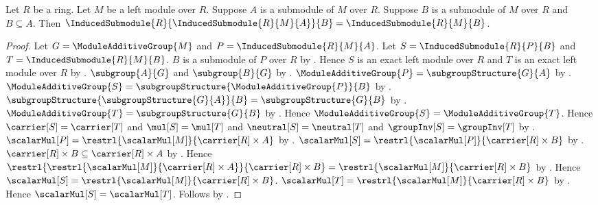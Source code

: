 \begin{theorem}\label{iterated_induced_submodule}
    Let $R$ be a ring.
    Let $M$ be a left module over $R$.
    Suppose $A$ is a submodule of $M$ over $R$.
    Suppose $B$ is a submodule of $M$ over $R$ and $B\subseteq A$.
    Then
        $\InducedSubmodule{R}{\InducedSubmodule{R}{M}{A}}{B}
            =\InducedSubmodule{R}{M}{B}$.
\end{theorem}
\begin{proof}
    Let $G=\ModuleAdditiveGroup{M}$ and
        $P=\InducedSubmodule{R}{M}{A}$.
    Let $S=\InducedSubmodule{R}{P}{B}$ and
        $T=\InducedSubmodule{R}{M}{B}$.
    $B$ is a submodule of $P$ over $R$ by
        .
    Hence $S$ is an exact left module over $R$ and
        $T$ is an exact left module over $R$ by
        .
    $\subgroup{A}{G}$ and $\subgroup{B}{G}$ by
        .
    $\ModuleAdditiveGroup{P}=\subgroupStructure{G}{A}$ by
        .
    $\ModuleAdditiveGroup{S}
        =\subgroupStructure{\ModuleAdditiveGroup{P}}{B}$ by
        .
    $\subgroupStructure{\subgroupStructure{G}{A}}{B}
        =\subgroupStructure{G}{B}$ by
        .
    $\ModuleAdditiveGroup{T}=\subgroupStructure{G}{B}$ by
        .
    Hence $\ModuleAdditiveGroup{S}=\ModuleAdditiveGroup{T}$.
    Hence $\carrier[S]=\carrier[T]$ and
        $\mul[S]=\mul[T]$ and
        $\neutral[S]=\neutral[T]$ and
        $\groupInv[S]=\groupInv[T]$ by
        .
    $\scalarMul[P]
        =\restrl{\scalarMul[M]}{\carrier[R]\times A}$ by
        .
    $\scalarMul[S]
        =\restrl{\scalarMul[P]}{\carrier[R]\times B}$ by
        .
    $\carrier[R]\times B\subseteq\carrier[R]\times A$ by
        .
    Hence
        $\restrl{\restrl{\scalarMul[M]}{\carrier[R]\times A}}{
            \carrier[R]\times B}
        =\restrl{\scalarMul[M]}{\carrier[R]\times B}$ by
        .
    Hence $\scalarMul[S]
        =\restrl{\scalarMul[M]}{\carrier[R]\times B}$.
    $\scalarMul[T]
        =\restrl{\scalarMul[M]}{\carrier[R]\times B}$ by
        .
    Hence $\scalarMul[S]=\scalarMul[T]$.
    Follows by .
\end{proof}

